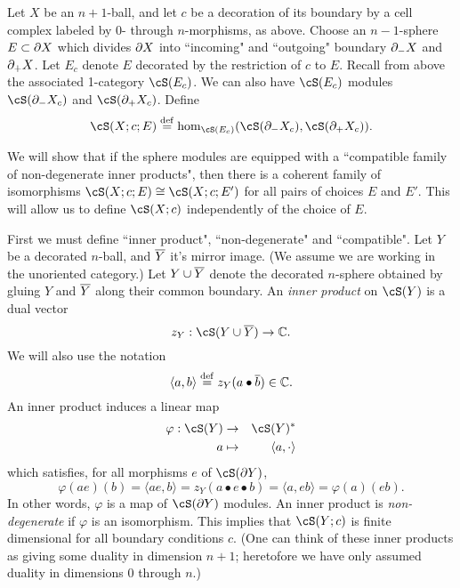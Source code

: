 Let $X$ be an $n{+}1$-ball, and let $c$ be a decoration of its boundary
by a cell complex labeled by 0- through $n$-morphisms, as above.
Choose an $n{-}1$-sphere $E\subset \partial X$ which divides
$\partial X$ into ``incoming" and ``outgoing" boundary $\partial_-X$ and $\partial_+X$.
Let $E_c$ denote $E$ decorated by the restriction of $c$ to $E$.
Recall from above the associated 1-category $\cS(E_c)$.
We can also have $\cS(E_c)$ modules $\cS(\bd_-X_c)$ and $\cS(\bd_+X_c)$.
Define
\[
	\cS(X; c; E) \deq \hom_{\cS(E_c)}(\cS(\bd_-X_c), \cS(\bd_+X_c)) .
\]

We will show that if the sphere modules are equipped with a ``compatible family of 
non-degenerate inner products", then there is a coherent family of isomorphisms
$\cS(X; c; E) \cong \cS(X; c; E')$ for all pairs of choices $E$ and $E'$.
This will allow us to define $\cS(X; c)$ independently of the choice of $E$.

First we must define ``inner product", ``non-degenerate" and ``compatible".
Let $Y$ be a decorated $n$-ball, and $\overline{Y}$ it's mirror image.
(We assume we are working in the unoriented category.)
Let $Y\cup\overline{Y}$ denote the decorated $n$-sphere obtained by gluing $Y$ and $\overline{Y}$
along their common boundary.
An {\it inner product} on $\cS(Y)$ is a dual vector
\[
	z_Y : \cS(Y\cup\ol{Y}) \to \c.
\]
We will also use the notation
\[
	\langle a, b\rangle \stackrel{\mathrm{def}}{=} z_Y(a\bullet \overline{b}) \in \mathbb{C} .
\]
An inner product induces a linear map
\begin{eqnarray*}
	\varphi: \cS(Y) &\to& \cS(Y)^* \\
	a &\mapsto& \langle a, \cdot \rangle
\end{eqnarray*}
which satisfies, for all morphisms $e$ of $\cS(\bd Y)$,
\[
	\varphi(ae)(b) = \langle ae, b \rangle = z_Y(a\bullet e\bullet b) = 
			\langle a, eb \rangle = \varphi(a)(eb) .
\]
In other words, $\varphi$ is a map of $\cS(\bd Y)$ modules.
An inner product is {\it non-degenerate} if $\varphi$ is an isomorphism.
This implies that $\cS(Y; c)$ is finite dimensional for all boundary conditions $c$.
(One can think of these inner products as giving some duality in dimension $n{+}1$;
heretofore we have only assumed duality in dimensions 0 through $n$.)

